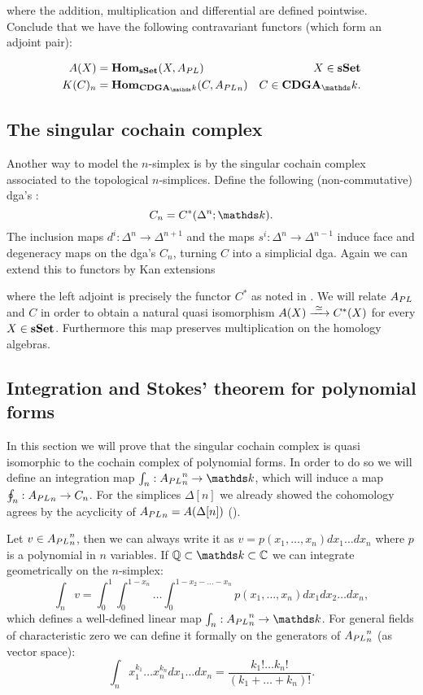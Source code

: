 where the addition, multiplication and differential are defined pointwise. Conclude that we have the following contravariant functors (which form an adjoint pair):

\begin{align*}
	A(X) &= \Hom_\sSet(X, \Apl) & X \in \sSet \\
	K(C)_n &= \Hom_{\CDGA_\k}(C, \Apl_n) & C \in \CDGA_\k.
\end{align*}


\subsection{The singular cochain complex}

Another way to model the $n$-simplex is by the singular cochain complex associated to the topological $n$-simplices. Define the following (non-commutative) dga's :
$$ C_n = C^\ast(\Delta^n; \k). $$
The inclusion maps $d^i : \Delta^n \to \Delta^{n+1}$ and the maps $s^i: \Delta^n \to \Delta^{n-1}$ induce face and degeneracy maps on the dga's $C_n$, turning $C$ into a simplicial dga. Again we can extend this to functors by Kan extensions


where the left adjoint is precisely the functor $C^\ast$ as noted in \cite{felix}. We will relate ${A_{PL}}$ and $C$ in order to obtain a natural quasi isomorphism $A(X) \xrightarrow{\,\,{\simeq}\,\,} C^\ast(X)$ for every $X \in \mathbf{s{\mathbf{Set}}}$. Furthermore this map preserves multiplication on the homology algebras.


\subsection{Integration and Stokes' theorem for polynomial forms}

In this section we will prove that the singular cochain complex is quasi isomorphic to the cochain complex of polynomial forms. In order to do so we will define an integration map $\int_n : \Apl_n^n \to \k$, which will induce a map $\oint_n : {A_{PL}}_n \to C_n$. For the simplices $\Delta[n]$ we already showed the cohomology agrees by the acyclicity of ${A_{PL}}_n = A(\Delta[n])$ ().

Let $v \in {A_{PL}}_n^n$, then we can always write it as $v = p(x_1, \dots, x_n)dx_1 \dots dx_n$ where $p$ is a polynomial in $n$ variables. If $\Q \subset \k \subset \mathbb{C}$ we can integrate geometrically on the $n$-simplex:
$$ \int_n v = \int_0^1 \int_0^{1-x_n} \dots \int_0^{1 - x_2 - \dots - x_n} p(x_1, \dots, x_n) dx_1 dx_2 \dots dx_n, $$
which defines a well-defined linear map $\int_n : \Apl_n^n \to \k$. For general fields of characteristic zero we can define it formally on the generators of ${A_{PL}}_n^n$ (as vector space):
$$ \int_n x_1^{k_1} \dots x_n^{k_n} dx_1 \dots dx_n = \frac{k_1! \dots k_n!}{(k_1 + \dots + k_n)!}. $$

